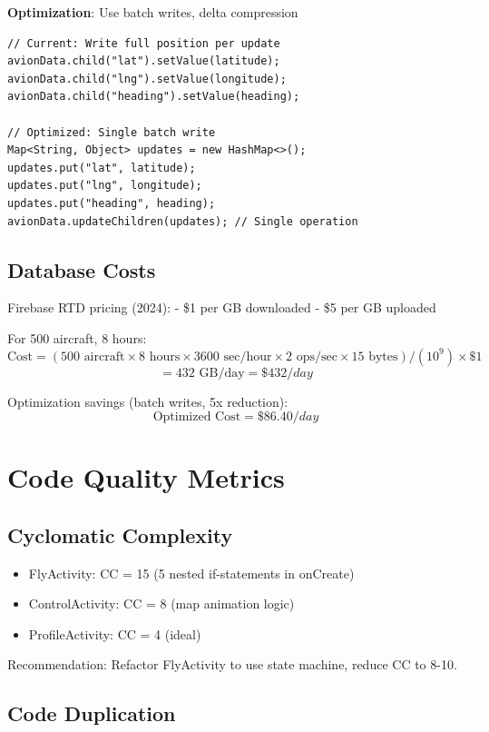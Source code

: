 \documentclass[11pt,a4paper]{report}
\begin{document}
\textbf{Optimization}: Use batch writes, delta compression

\begin{lstlisting}
// Current: Write full position per update
avionData.child("lat").setValue(latitude);
avionData.child("lng").setValue(longitude);
avionData.child("heading").setValue(heading);

// Optimized: Single batch write
Map<String, Object> updates = new HashMap<>();
updates.put("lat", latitude);
updates.put("lng", longitude);
updates.put("heading", heading);
avionData.updateChildren(updates); // Single operation
\end{lstlisting}

\subsection{Database Costs}

Firebase RTD pricing (2024):
- \$1 per GB downloaded
- \$5 per GB uploaded

For 500 aircraft, 8 hours:
\[
\text{Cost} = (500 \text{ aircraft} \times 8 \text{ hours} \times 3600 \text{ sec/hour} \times 2 \text{ ops/sec} \times 15 \text{ bytes}) / (10^9) \times \$1
\]
\[
= 432 \text{ GB/day} = \$432/day
\]

Optimization savings (batch writes, 5x reduction):
\[
\text{Optimized Cost} = \$86.40/day
\]

\section{Code Quality Metrics}

\subsection{Cyclomatic Complexity}

\begin{itemize}
    \item FlyActivity: CC = 15 (5 nested if-statements in onCreate)
    \item ControlActivity: CC = 8 (map animation logic)
    \item ProfileActivity: CC = 4 (ideal)
\end{itemize}

Recommendation: Refactor FlyActivity to use state machine, reduce CC to 8-10.

\subsection{Code Duplication}
\end{document}
